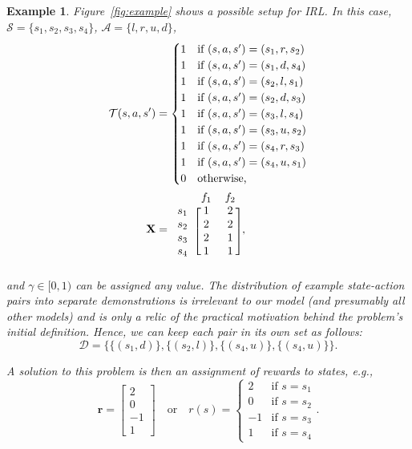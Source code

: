 \documentclass{mpaper}
\newtheorem{example}[theorem]{Example}
\begin{document}
\begin{example}
  Figure~\ref{fig:example} shows a possible setup for IRL. In this case,
  $\mathcal{S} = \{ s_1, s_2, s_3, s_4 \}$, $\mathcal{A} = \{ l, r, u, d \}$,
  \begin{align*}
    \mathcal{T}(s, a, s') &= \begin{cases}
      1 & \text{if } (s, a, s') = (s_1, r, s_2) \\
      1 & \text{if } (s, a, s') = (s_1, d, s_4) \\
      1 & \text{if } (s, a, s') = (s_2, l, s_1) \\
      1 & \text{if } (s, a, s') = (s_2, d, s_3) \\
      1 & \text{if } (s, a, s') = (s_3, l, s_4) \\
      1 & \text{if } (s, a, s') = (s_3, u, s_2) \\
      1 & \text{if } (s, a, s') = (s_4, r, s_3) \\
      1 & \text{if } (s, a, s') = (s_4, u, s_1) \\
      0 & \text{otherwise,}
    \end{cases} \\
      \mathbf{X} &= \begin{blockarray}{ccc}
        & f_1 & f_2 \\
        \begin{block}{c[cc]}
          s_1 & 1 & 2 \\
          s_2 & 2 & 2 \\
          s_3 & 2 & 1 \\
          s_4 & 1 & 1 \\
        \end{block}
      \end{blockarray},
  \end{align*}
  and $\gamma \in [0, 1)$ can be assigned any value. The distribution of example
  state-action pairs into separate demonstrations is irrelevant to our model
  (and presumably all other models) and is only a relic of the practical
  motivation behind the problem's initial definition. Hence, we can keep each
  pair in its own set as follows:
  \[
    \mathcal{D} = \{ \{(s_1, d)\}, \{(s_2, l)\}, \{(s_4, u)\}, \{(s_4, u)\} \}.
  \]

  A solution to this problem is then an assignment of rewards to states, e.g.,
  \[
    \mathbf{r} = \begin{bmatrix}
      2 \\
      0 \\
      -1 \\
      1
    \end{bmatrix} \quad \text{or} \quad r(s) = \begin{cases}
      2 & \text{if } s = s_1 \\
      0 & \text{if } s = s_2 \\
      -1 & \text{if } s = s_3 \\
      1 & \text{if } s = s_4
    \end{cases}.
  \]
\end{example}
\end{document}
